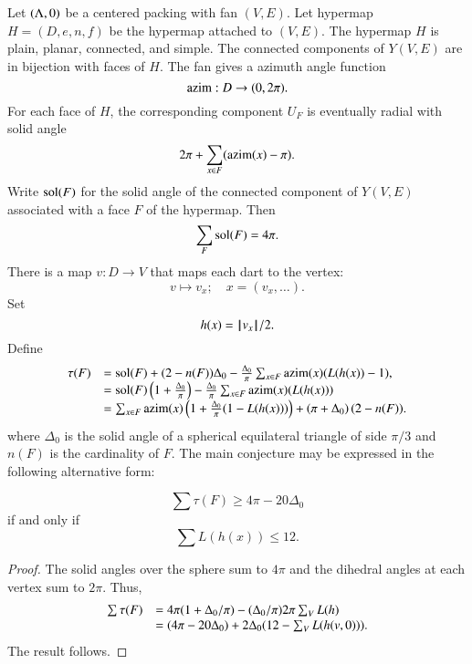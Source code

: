 Let $(\Lambda,0)$ be a centered packing with
fan $(V,E)$.  Let  hypermap $H=(D,e,n,f)$
be the hypermap attached to $(V,E)$.
The hypermap $H$ is plain, planar, connected, and simple.
The connected components of $Y(V,E)$ are in bijection with
faces of $H$.  
The fan gives a azimuth angle function
$$
{\operatorname{azim}} : D \to (0,2\pi).
$$
For each face of $H$, the corresponding component $U_F$
is eventually radial with solid
angle
  $$
  2\pi + \sum_{x\in F} ({\operatorname{azim}}(x) -\pi).
  $$
Write $\operatorname{sol}(F)$ for the solid angle of the connected component
of $Y(V,E)$ associated with a face $F$ of the hypermap.
Then
    $$\sum_{F} \operatorname{sol}(F) = 4\pi.$$
There is a map $v:D\to V$ that maps each dart to the vertex:
$$
v \mapsto v_x; \quad   x = (v_x,\ldots).
$$
Set 
$$h(x) = {{\hskip0.1em|\hskip-0.15em|\hskip0.1em}v_x{\hskip0.1em|\hskip-0.15em|\hskip0.1em}}/2.$$
Define
\begin{equation}
\begin{array}{lll}
\tau(F) &= \operatorname{sol}(F) + (2- n(F))\Delta_0 - \frac{\Delta_0}{\pi}\sum_{x\in F}{\operatorname{azim}}(x) (L(h(x)) - 1),\\
  &= \operatorname{sol}(F) \left( 1 + \frac{\Delta_0}{\pi}\right) - \frac{\Delta_0}{\pi} \sum_{x\in F} {\operatorname{azim}}(x)(L(h(x)))\\
  &=\sum_{x\in F} {\operatorname{azim}}(x)\left(1 + \frac{\Delta_0}{\pi}(1- L(h(x)))\right) + \left(\pi+{\Delta_0}\right) (2- n(F)).
\end{array}
\end{equation}
where $\Delta_0$ is the solid angle of a spherical equilateral triangle of side $\pi/3$ and $n(F)$ is the cardinality of $F$.
The main conjecture may be expressed in the following alternative form:

\begin{lemma}
$$
\sum \tau (F) \ge 4\pi - 20\Delta_0
$$
if and only if
$$
\sum L(h(x)) \le 12.
$$
\end{lemma}

\begin{proof}
The solid angles over the sphere sum to $4\pi$ and the dihedral angles at each vertex sum to $2\pi$. 
Thus,
\begin{equation}\label{eqn:delta0}
\begin{array}{lll}
\sum \tau (F) 
&= 4\pi (1 + \Delta_0/\pi) - (\Delta_0/\pi) 2\pi \sum_{V} L(h)\\

&= (4\pi - 20\Delta_0) + 2\Delta_0 (12 - \sum_V L(h(v,0))).
\end{array}
\end{equation}
The result follows.
\end{proof}

